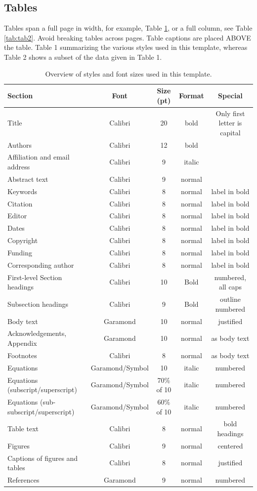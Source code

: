 \documentclass[10pt]{imeko_acta}
\begin{document}
\subsection{Tables}

Tables span a full page in width, for example, Table \ref{tab:tab1}, or a full column, see Table \ref{tab:tab2}. Avoid breaking tables across pages.
Table captions are placed ABOVE the table. 
Table 1 summarizing the various styles used in this template, whereas Table 2 shows a subset of the data given in Table 1.

\begin{table}[!h]
	\caption{Overview of styles and font sizes used in this template.}
	\label{tab:tab1}
	\centering
	\begin{tabular}{lcccc}
		\toprule
		Section & Font & Size (pt) & Format & Special \\
		\midrule
		Title & Calibri & 20 & bold & Only first letter is capital \\
		Authors & Calibri & 12 & bold &  \\
		Affiliation and email address & Calibri & 9 & italic &  \\
		Abstract text & Calibri & 9 & normal &  \\
		Keywords & Calibri & 8 & normal & label in bold \\
		Citation & Calibri & 8 & normal & label in bold \\
		Editor & Calibri & 8 & normal & label in bold \\
		Dates & Calibri & 8 & normal & label in bold \\
		Copyright & Calibri & 8 & normal & label in bold \\
		Funding & Calibri & 8 & normal & label in bold \\
		Corresponding author & Calibri & 8 & normal & label in bold \\
		First-level Section headings  & Calibri & 10 & Bold & numbered, all caps \\
		Subsection headings & Calibri & 9 & Bold & outline numbered \\
		Body text & Garamond & 10 & normal & justified \\
		Acknowledgements, Appendix & Garamond & 10 & normal & as body text \\
		Footnotes  & Calibri & 8 & normal & as body text \\
		Equations & Garamond/Symbol & 10 & italic & numbered \\
		Equations (subscript/superscript) & Garamond/Symbol & 70\% of 10 & italic & numbered \\
		Equations (sub-subscript/superscript) & Garamond/Symbol & 60\% of 10 & italic & numbered \\
		Table text & Calibri & 8 & normal & bold headings \\
		Figures & Calibri & 9 & normal & centered \\
		Captions of figures and tables & Calibri & 8 & normal & justified \\
		References & Garamond & 9 & normal & numbered \\
		\bottomrule
	\end{tabular}
\end{table}
\end{document}
